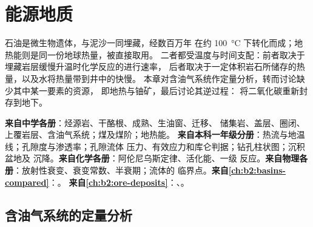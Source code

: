 \chapter{能源地质}\label{ch:b2:energy-geology}

石油是微生物遗体，与泥沙一同埋藏，经数百万年
在约 \qty{100}{\celsius} 下转化而成；地热能则是同一份地球热量，被直接取用。
二者都受温度与时间支配：前者取决于埋藏岩层缓慢升温时化学反应的进行速率，
后者取决于一定体积岩石所储存的热量，以及水将热量带到井中的快慢。
本章对含油气系统作定量分析，转而讨论缺少其中某一要素的资源，
即地热与铀矿，最后讨论其逆过程：
将二氧化碳重新封存到地下。

\begin{recall}
\textbf{来自中学各册}：烃源岩、干酪根、成熟、生油窗、迁移、
储集岩、盖层、圈闭、上覆岩层、含油气系统；煤及煤阶；地热能。
\textbf{来自本科一年级分册}：热流与地温线；孔隙度与渗透率；孔隙流体
压力、有效应力和库仑判据；钻孔柱状图；沉积盆地及
沉降。\textbf{来自化学各册}：阿伦尼乌斯定律、活化能、一级
反应。\textbf{来自物理各册}：放射性衰变、衰变常数、半衰期；流体的
临界点。\textbf{来自\cref{ch:b2:basins-compared}}：。
\textbf{来自\cref{ch:b2:ore-deposits}}：、。
\end{recall}

\section{含油气系统的定量分析}\label{sec:b2:energy-geology:petroleum}

